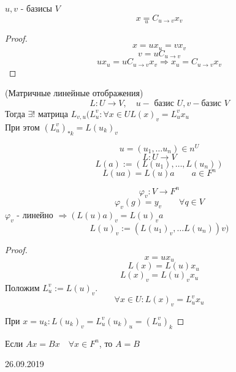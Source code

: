 \documentclass[12pt]{report}
\begin{document}
\begin{cor}
    $u, v$ - базисы $V$
    $$x  \underset{u}= C_{u \to v} x_v$$
\end{cor}
\begin{proof}
    $$ x = ux_u = v x_v$$
    $$ v = u C_{u \to v}$$
    $$ ux_u = u C_{u \to v} x_v \Rightarrow x_u = C_{u \to v} x_v$$
\end{proof}
\begin{cor}
    (Матричные линейные отображения)\\
    $$ L: U \to V, \quad u - \mbox{ базис } U, v - \mbox{базис } V$$
    Тогда $\exists ! $ матрица $L_{v,u} (L_u^v: \forall x \in U L(x)_v = L_u^v x_u$\\
    При этом $(L_u^v)_{*k} = L(u_k)_v$
\end{cor}
\begin{note}
    $$u = (u_1, \ldots u_n) \in n^U$$
    $$L:U \to V$$
    $$L(a) := (L(u_1), \ldots, L(u_n))$$
    $$L(u a) = L(u) a \qquad a \in F^n$$

    $$\varphi_v : V \to F^n$$
    $$\varphi _v(g) = y_v \qquad \forall q \in V$$
    $\varphi_v$ - линейно $\Rightarrow (L(u) a) _v = L(u)_v a$
    $$ L(u)_v := (L(u_1)_v, \ldots L(u_n))v)$$
\end{note}
\begin{proof}
    $$x = u x_u$$ $$ \quad L(x) = L(u) x_u$$
    $$ L(x)_v = L(u)_v x_u$$
    Положим $L_u^v := L(u)_v$.\\
    $$ \forall x \in U : L(x) _v = L_u^v x_u$$
    
    При $x = u_k : L(u_k)_v = L_u ^v (u_k)_u = (L_u^v)_k$
\end{proof}
\begin{note}
    Если $Ax = Bx \quad \forall x \in F^n$, то $A=B$
\end{note}

26.09.2019
\end{document}
